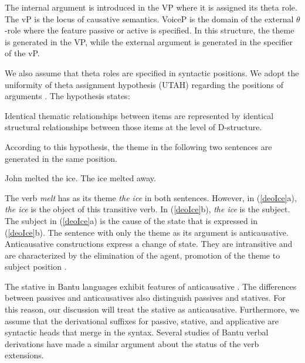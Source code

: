 \documentclass[output=paper]{langscibook}
\begin{document}
The internal argument is introduced in the VP where it is assigned its theta role. The vP is the locus of causative semantics. VoiceP is the domain of the external $\theta$-role where the feature passive or active is specified. In this structure, the theme is generated in the VP, while the external argument is generated in the specifier of the vP.

We also assume that theta roles are specified in syntactic positions. We adopt the uniformity of theta assignment hypothesis (UTAH) regarding the positions of arguments \citep{Baker:1988aa}. The hypothesis states:

\begin{exe}
\ex\label{deo2}
Identical thematic relationships between items are represented by identical structural relationships between those items at the level of D-structure. \citep[46]{Baker:1988aa}
\end{exe}

According to this hypothesis, the theme in the following two sentences are generated in the same position.\largerpage[2]

\begin{exe}
\ex\label{deoIce}
\begin{xlist}
\ex John melted the ice.
\ex The ice melted away.
\end{xlist}
\end{exe}

The verb \textit{melt} has as its theme \textit{the ice} in both sentences. However, in (\ref{deoIce}a), \textit{the ice} is the object of this transitive verb. In (\ref{deoIce}b), \textit{the ice} is the subject. The subject in (\ref{deoIce}a) is the cause of the state that is expressed in (\ref{deoIce}b). The sentence with only the theme as its argument is anticausative. Anticausative constructions express a change of state. They are intransitive and are characterized by the elimination of the agent, promotion of the theme to subject position \citep{domEtal2016,Haspelmathl2016,Heidinger2015,Kulikov2011}.

The stative in Bantu languages exhibit features of anticausative \citep{domEtal2016,Gluckman2016,MallyaEtal2019}. The differences between passives and anticausatives also distinguish passives and statives. For this reason, our discussion will treat the stative as anticausative. Furthermore, we assume that the derivational suffixes for passive, stative, and applicative are syntactic heads that merge in the syntax. Several studies of Bantu verbal derivations \citep{Baker1985,Baker:1988aa,Harley2013,MallyaEtal2019,Ngonyani:2016aa,pylkkanen08,SeidlDimitriadis2003} have made a similar argument about the status of the verb extensions. 
\end{document}
